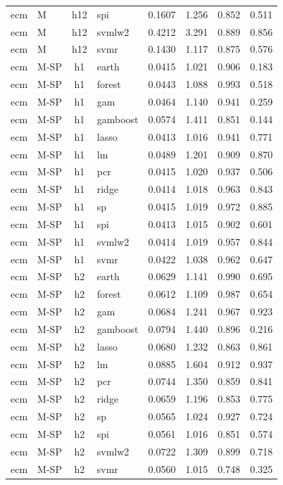 \begin{ThreePartTable}
\begin{longtable}[t]{llclcccc}
ecm & M & h12 & spi & 0.1607 & 1.256 & 0.852 & 0.511\\
ecm & M & h12 & svmlw2 & 0.4212 & 3.291 & 0.889 & 0.856\\
ecm & M & h12 & svmr & 0.1430 & 1.117 & 0.875 & 0.576\\
\addlinespace
ecm & M-SP & h1 & earth & 0.0415 & 1.021 & 0.906 & 0.183\\
ecm & M-SP & h1 & forest & 0.0443 & 1.088 & 0.993 & 0.518\\
ecm & M-SP & h1 & gam & 0.0464 & 1.140 & 0.941 & 0.259\\
ecm & M-SP & h1 & gamboost & 0.0574 & 1.411 & 0.851 & 0.144\\
ecm & M-SP & h1 & lasso & 0.0413 & 1.016 & 0.941 & 0.771\\
ecm & M-SP & h1 & lm & 0.0489 & 1.201 & 0.909 & 0.870\\
ecm & M-SP & h1 & pcr & 0.0415 & 1.020 & 0.937 & 0.506\\
ecm & M-SP & h1 & ridge & 0.0414 & 1.018 & 0.963 & 0.843\\
ecm & M-SP & h1 & sp & 0.0415 & 1.019 & 0.972 & 0.885\\
ecm & M-SP & h1 & spi & 0.0413 & 1.015 & 0.902 & 0.601\\
ecm & M-SP & h1 & svmlw2 & 0.0414 & 1.019 & 0.957 & 0.844\\
ecm & M-SP & h1 & svmr & 0.0422 & 1.038 & 0.962 & 0.647\\
\addlinespace
ecm & M-SP & h2 & earth & 0.0629 & 1.141 & 0.990 & 0.695\\
ecm & M-SP & h2 & forest & 0.0612 & 1.109 & 0.987 & 0.654\\
ecm & M-SP & h2 & gam & 0.0684 & 1.241 & 0.967 & 0.923\\
ecm & M-SP & h2 & gamboost & 0.0794 & 1.440 & 0.896 & 0.216\\
ecm & M-SP & h2 & lasso & 0.0680 & 1.232 & 0.863 & 0.861\\
ecm & M-SP & h2 & lm & 0.0885 & 1.604 & 0.912 & 0.937\\
ecm & M-SP & h2 & pcr & 0.0744 & 1.350 & 0.859 & 0.841\\
ecm & M-SP & h2 & ridge & 0.0659 & 1.196 & 0.853 & 0.775\\
ecm & M-SP & h2 & sp & 0.0565 & 1.024 & 0.927 & 0.724\\
ecm & M-SP & h2 & spi & 0.0561 & 1.016 & 0.851 & 0.574\\
ecm & M-SP & h2 & svmlw2 & 0.0722 & 1.309 & 0.899 & 0.718\\
ecm & M-SP & h2 & svmr & 0.0560 & 1.015 & 0.748 & 0.325\\

\end{longtable}
\end{ThreePartTable}
